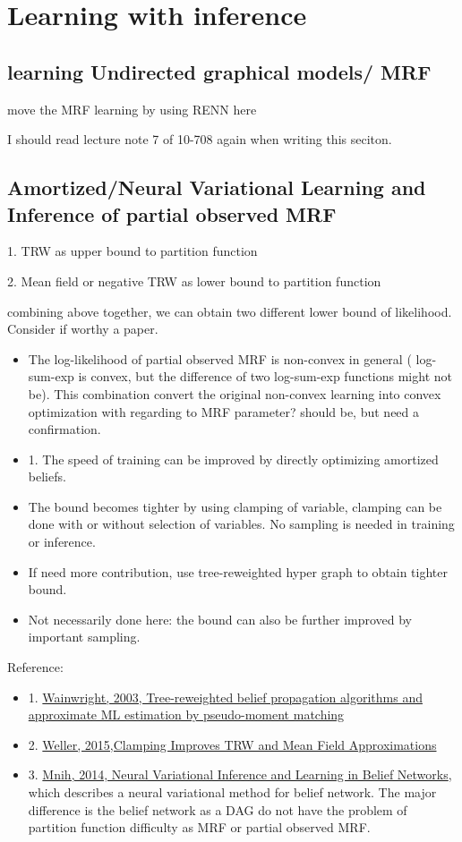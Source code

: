 \chapter{Learning with inference}


\section{learning Undirected graphical models/ MRF}
move the MRF learning by using RENN here

I should read lecture note 7 of 10-708 again when writing this seciton.

\section{Amortized/Neural Variational Learning and Inference of partial observed MRF}
1. TRW as upper bound to partition function

2. Mean field or negative TRW as lower bound to partition function

combining above together, we can obtain two different lower bound of likelihood. Consider if worthy a paper.

\begin{itemize}
\item The log-likelihood of partial observed MRF is non-convex in general ( log-sum-exp is convex, but the difference of two log-sum-exp functions might not be). This combination convert the original non-convex learning into convex optimization with regarding to MRF parameter? should be, but need a confirmation.
\item 1. The speed of training can be improved by directly optimizing amortized beliefs.
\item The bound becomes tighter by using clamping of variable, clamping can be done with or without selection of variables. No sampling is needed in training or inference.
\item If need more contribution, use tree-reweighted hyper graph to obtain tighter bound.
  
\item Not necessarily done here: the bound can also be further improved by important sampling.
\end{itemize}

Reference:
\begin{itemize}
\item 1. \href{http://ssg.mit.edu/group/willsky/publ_pdfs/166_pub_AISTATS.pdf}{Wainwright, 2003, Tree-reweighted belief propagation algorithms and approximate ML estimation by pseudo-moment matching}
\item 2. \href{https://arxiv.org/abs/1510.00087}{Weller, 2015,Clamping Improves TRW and Mean Field Approximations}
\item 3. \href{https://arxiv.org/pdf/1402.0030.pdf}{Mnih, 2014, Neural Variational Inference and Learning in Belief Networks}, which describes a neural variational method for belief network. The major difference is the belief network as a DAG do not have the problem of partition function difficulty as MRF or partial observed MRF.
  
\end{itemize}

